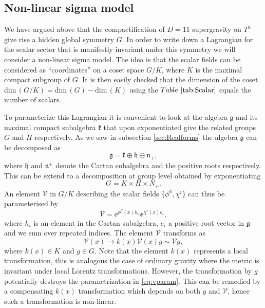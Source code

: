 \subsection{Non-linear sigma model\label{sec:NonLinearSigmaModels}}
We have argued above that the compactification of $D=11$ supergravity on $T^n$ give rise a hidden global symmetry $G$. In order to write down a Lagrangian for the scalar sector that is manifestly invariant under this symmetry we will consider a non-linear sigma model. The idea is that the scalar fields can be considered as ``coordinates'' on a coset space $G/K$, where $K$ is the maximal compact subgroup of $G$. It is then easily checked that the dimension of the coset $\text{dim}\,(G/K)=\text{dim}\,(G)-\text{dim}\,(K)$ using the $\tabref{tab:Scalar}$ equals the number of scalars. 

To parameterize this Lagrangian it is convenient to look at the algebra $\mathfrak{g}$ and its maximal compact subalgebra $\mathfrak{k}$ that upon exponentiated give the related groups $G$ and $H$ respectively. As we saw in subsection \ref{sec:Realforms} the algebra $\mathfrak{g}$ can be decomposed as 
\begin{equation}
    \mathfrak{g} = \mathfrak{k}\oplus \mathfrak{h}\oplus\mathfrak{n}_+,
\end{equation}
where $\mathfrak{h}$ and $\mathfrak{n}^+$ denote the Cartan subalgebra and the positive roots respectively. This can be extend to a decomposition at group level obtained by exponentiating 
\begin{equation}
    G = K\times H\times N_+.
\end{equation}
An element $\mathcal{V}$ in $G/K$ describing the scalar fields $\{\phi^a,\chi^i\}$ can thus be parameterised by 
\begin{equation}\label{eq:vparam}
    \mathcal{V} = \ee^{\phi^a(x)h_a}\ee^{\chi^i(x)e_i},
\end{equation}
where $h_i$ is an element in the Cartan subalgebra, $e_i$ a positive root vector in $\mathfrak{g}$ and we sum over repeated indices. The element $\mathcal{V}$ transforms as 
\begin{equation}
    \mathcal{V}(x) \to k(x)\mathcal{V}(x)g\sim \mathcal{V}g,
\end{equation}
where $k(x)\in K$ and $g\in G$. Note that the element $k(x)$ represents a local transformation, this is analogous the case of ordinary gravity where the metric is invariant under local Lorentz transformations. However, the transformation by $g$ potentially destroys the parametrization in \eqref{eq:vparam}. This can be remedied by a compensating $k(x)$ transformation which depends on both $g$ and $\mathcal{V}$, hence such a transformation is non-linear. 




